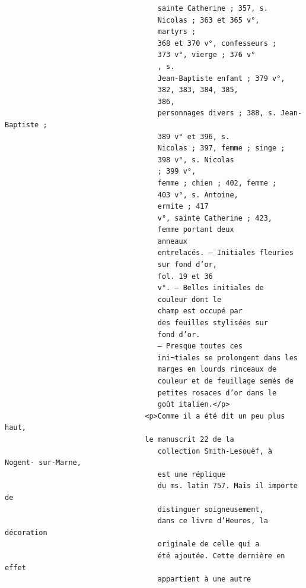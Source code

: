 \documentclass[a4paper,12pt,twoside]{book}
\begin{document}
\begin{verbatim}
                                    sainte Catherine ; 357, s. 
                                    Nicolas ; 363 et 365 v°,
                                    martyrs ;
                                    368 et 370 v°, confesseurs ; 
                                    373 v°, vierge ; 376 v°
                                    , s.
                                    Jean-Baptiste enfant ; 379 v°, 
                                    382, 383, 384, 385,
                                    386,
                                    personnages divers ; 388, s. Jean-Baptiste ; 
                                    389 v° et 396, s.
                                    Nicolas ; 397, femme ; singe ; 
                                    398 v°, s. Nicolas
                                    ; 399 v°,
                                    femme ; chien ; 402, femme ; 
                                    403 v°, s. Antoine,
                                    ermite ; 417
                                    v°, sainte Catherine ; 423, 
                                    femme portant deux
                                    anneaux
                                    entrelacés. — Initiales fleuries 
                                    sur fond d’or, 
                                    fol. 19 et 36
                                    v°. — Belles initiales de
                                    couleur dont le
                                    champ est occupé par
                                    des feuilles stylisées sur
                                    fond d’or. 
                                    — Presque toutes ces
                                    ini¬tiales se prolongent dans les 
                                    marges en lourds rinceaux de
                                    couleur et de feuillage semés de
                                    petites rosaces d’or dans le
                                    goût italien.</p>
                                 <p>Comme il a été dit un peu plus haut, 
                                 le manuscrit 22 de la
                                    collection Smith-Lesouëf, à Nogent- sur-Marne, 
                                    est une réplique
                                    du ms. latin 757. Mais il importe de 
                                    distinguer soigneusement,
                                    dans ce livre d’Heures, la décoration 
                                    originale de celle qui a
                                    été ajoutée. Cette dernière en effet
                                    appartient à une autre

\end{verbatim}
\end{document}
